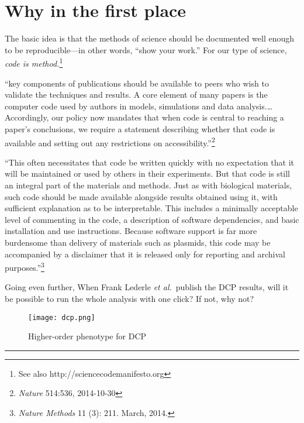 \documentclass{tufte-handout}
\begin{document}
\section{Why in the first place}

The basic idea is that the methods of science should be documented
well enough to be reproducible---in other words, ``show your work.''
For our type of science, \emph{code is method.}\footnote{See also
http://sciencecodemanifesto.org}

``key components of publications should be available to peers who wish
to validate the techniques and results. A core element of many papers
is the computer code used by authors in models, simulations and data
analysis.\ldots{} Accordingly, our policy now mandates that when code
is central to reaching a paper's conclusions, we require a statement
describing whether that code is available and setting out any
restrictions on accessibility.''\footnote{\emph{Nature} 514:536,
  2014-10-30}

``This often necessitates that code be written quickly with no
expectation that it will be maintained or used by others in their
experiments. But that code is still an integral part of the materials
and methods. Just as with biological materials, such code should be
made available alongside results obtained using it, with sufficient
explanation as to be interpretable. This includes a minimally
acceptable level of commenting in the code, a description of software
dependencies, and basic installation and use instructions. Because
software support is far more burdensome than delivery of materials
such as plasmids, this code may be accompanied by a disclaimer that it
is released only for reporting and archival
purposes.''\footnote{\emph{Nature Methods} 11 (3): 211. March, 2014.}

Going even further, When Frank Lederle \emph{et al.}\ publish the DCP
results, will it be possible to run the whole analysis with one click?
If not, why not?

\begin{figure}
\texttt{[image: dcp.png]}
\caption{Higher-order phenotype for DCP}
\label{dcpgraph}
\end{figure}

\vspace{4ex}


\noindent \rule{\textwidth}{1pt}





\end{document}
